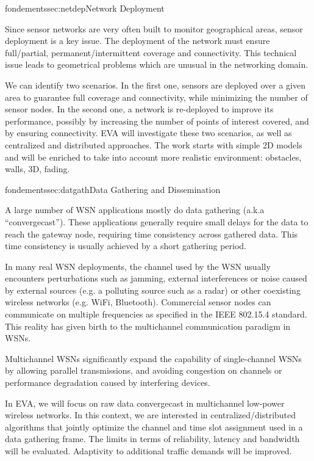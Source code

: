 \documentclass{ra2016}
\begin{document}
\begin{module}{fondements}{sec:netdep}{Network Deployment}

Since sensor networks are very often built to monitor geographical areas, sensor deployment is a key issue. The deployment of the network must ensure full/partial, permanent/intermittent coverage and connectivity. This technical issue leads to geometrical problems which are unusual in the networking domain.

We can identify two scenarios. In the first one, sensors are deployed over a given area to guarantee full coverage and connectivity, while minimizing the number of sensor nodes. In the second one, a network is re-deployed to improve its performance, possibly by increasing the number of points of interest covered, and by ensuring connectivity. EVA will investigate these two scenarios, as well as centralized and distributed approaches. The work starts 
with simple 2D models and will be enriched to take into account more realistic 
environment: obstacles, walls, 3D, fading. 

\end{module}

\begin{module}{fondements}{sec:datgath}{Data Gathering and Dissemination}

A large number of WSN applications mostly do data gathering (a.k.a ``convergecast''). These applications generally require small delays for the data to reach the gateway node, requiring time consistency across gathered data. This time consistency is usually achieved by a short gathering period.

In many real WSN deployments, the channel used by the WSN usually encounters perturbations such as jamming, external interferences or noise caused by external sources (e.g. a polluting source such as a radar) or other coexisting wireless networks (e.g. WiFi, Bluetooth). Commercial sensor nodes can communicate on multiple frequencies as specified in the IEEE 802.15.4 standard. This reality has given birth to the multichannel communication paradigm in WSNs.

Multichannel WSNs significantly expand the capability of single-channel WSNs by allowing parallel transmissions, and avoiding congestion on channels or performance degradation caused by interfering devices.

In EVA, we will focus on raw data convergecast in multichannel low-power wireless networks. In this context, we are interested in centralized/distributed algorithms that jointly optimize the channel and time slot assignment used in a data gathering frame. The limits in terms of reliability, latency and bandwidth will be evaluated. Adaptivity to additional traffic demands will be improved. 

\end{module}
\end{document}
